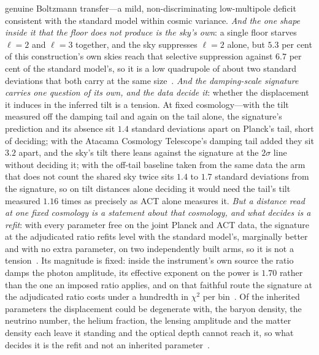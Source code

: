 \documentclass[11pt,a4paper]{article}
\theoremstyle{plain}
\theoremstyle{definition}
\theoremstyle{remark}
\begin{document}
\begin{enumerate}
genuine Boltzmann transfer---a mild, non-discriminating low-multipole deficit consistent with the standard model within cosmic variance.  \emph{And the one shape inside it that the floor does not produce is the sky's own}: a single floor starves $\ell=2$ and $\ell=3$ together, and the sky suppresses $\ell=2$ alone, but $5.3$ per cent of this construction's own skies reach that selective suppression against $6.7$ per cent of the standard model's, so it is a low quadrupole of about two standard deviations that both carry at the same size~\cite{JanzenCRcosmology}.  \emph{And the damping-scale signature carries one question of its own, and the data decide it}: whether the displacement it induces in the inferred tilt is a tension. At fixed cosmology---with the tilt measured off the damping tail and again on the tail alone, the signature's prediction and its absence sit $1.4$ standard deviations apart on Planck's tail, short of deciding; with the Atacama Cosmology Telescope's damping tail added they sit $3.2$ apart, and the sky's tilt there leans against the signature at the $2\sigma$ line without deciding it; with the off-tail baseline taken from the same data the arm that does not count the shared sky twice sits $1.4$ to $1.7$ standard deviations from the signature, so on tilt distances alone deciding it would need the tail's tilt measured $1.16$ times as precisely as ACT alone measures it. \emph{But a distance read at one fixed cosmology is a statement about that cosmology, and what decides is a refit}: with every parameter free on the joint Planck and ACT data, the signature at the adjudicated ratio refits level with the standard model's, marginally better and with no extra parameter, on two independently built arms, so it is not a tension~\cite{JanzenCRcosmology}. Its magnitude is fixed: inside the instrument's own source the ratio damps the photon amplitude, its effective exponent on the power is $1.70$ rather than the one an imposed ratio applies, and on that faithful route the signature at the adjudicated ratio costs under a hundredth in $\chi^{2}$ per bin~\cite{JanzenCRcosmology}.  Of the inherited parameters the displacement could be degenerate with, the baryon density, the neutrino number, the helium fraction, the lensing amplitude and the matter density each leave it standing and the optical depth cannot reach it, so what decides it is the refit and not an inherited parameter~\cite{JanzenCRcosmology}.



\end{enumerate}
\end{document}
